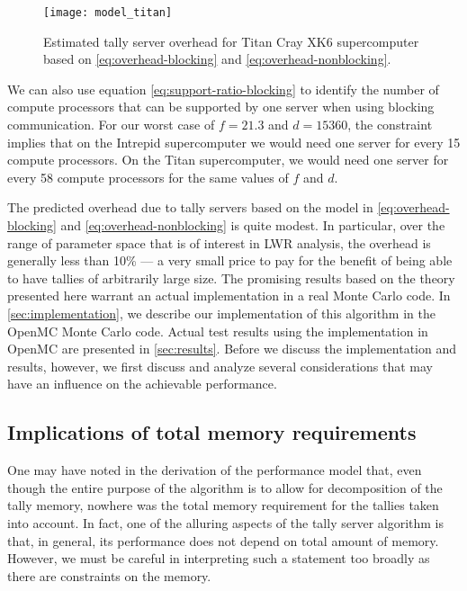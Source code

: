 \documentclass[3p]{elsarticle}
\begin{document}
\begin{figure}[htb]
  \centering
  \texttt{[image: model\_titan]}
  \caption{Estimated tally server overhead for Titan Cray XK6 supercomputer
    based on \eqref{eq:overhead-blocking} and \eqref{eq:overhead-nonblocking}.}
  \label{fig:model-titan}
\end{figure}

We can also use equation \eqref{eq:support-ratio-blocking} to identify the
number of compute processors that can be supported by one server when using
blocking communication. For our worst case of $f = 21.3$ and $d = 15360$, the
constraint implies that on the Intrepid supercomputer we would need one server
for every 15 compute processors. On the Titan supercomputer, we would need one
server for every 58 compute processors for the same values of $f$ and $d$.

The predicted overhead due to tally servers based on the model in
\eqref{eq:overhead-blocking} and \eqref{eq:overhead-nonblocking} is quite
modest. In particular, over the range of parameter space that is of interest in
LWR analysis, the overhead is generally less than 10\% --- a very small price to
pay for the benefit of being able to have tallies of arbitrarily large size. The
promising results based on the theory presented here warrant an actual
implementation in a real Monte Carlo code. In \autoref{sec:implementation}, we
describe our implementation of this algorithm in the OpenMC Monte Carlo
code. Actual test results using the implementation in OpenMC are presented in
\autoref{sec:results}. Before we discuss the implementation and results,
however, we first discuss and analyze several considerations that may have an
influence on the achievable performance.

\subsection{Implications of total memory requirements}

One may have noted in the derivation of the performance model that, even though
the entire purpose of the algorithm is to allow for decomposition of the tally
memory, nowhere was the total memory requirement for the tallies taken into
account. In fact, one of the alluring aspects of the tally server algorithm is
that, in general, its performance does not depend on total amount of
memory. However, we must be careful in interpreting such a statement too broadly
as there are constraints on the memory.
\end{document}
